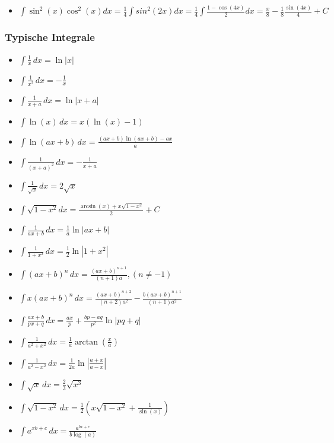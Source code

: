 \documentclass[25pt]{sciposter}
\begin{document}
\begin{multicols}{3}
\begin{itemize}
	\item $\int \sin^2(x) \cos^2(x) dx = \frac{1}{4}\int sin^2(2x) dx = \frac{1}{4} \int \frac{1-\cos(4x)}{2}dx = \frac{x}{8} - \frac{1}{8} \frac{\sin(4x)}{4} + C$  
	
\end{itemize}



\subsubsection*{Typische Integrale}

\begin{itemize}
	\item $\int \frac{1}{x} \,dx = \ln |x|$
	\item $\int \frac{1}{x^2} \,dx = -\frac{1}{x}$
	\item $\int \frac{1}{x+a} \,dx = \ln |x+a|$
	\item $\int \ln(x) \,dx = x(\ln(x) - 1)$
	\item $\int \ln(ax + b) \,dx = \frac{(a x+b) \ln (a x+b)-a x}{a}$
	\item $\int \frac{1}{(x+a)^2} \,dx = - \frac{1}{x+a}$
	\item $\int \frac{1}{\sqrt{x}} \,dx = 2 \sqrt{x}$
	\item $\int \sqrt{1-x^2} dx = \frac{\arcsin(x) + x \sqrt{1-x^2}}{2} + C$
	\item $\int \frac{1}{ax+b} \,dx = \frac{1}{a} \ln |ax+b|$
	\item $\int \frac{1}{1 + x^2} \,dx = \frac{1}{2} \ln |1 + x^2|$
	\item $\int(ax + b)^n \,dx = \frac{(ax + b)^{n+1}}{(n + 1)a}, (n \neq -1)$
	\item $\int x(ax+b)^n \,dx = \frac{(ax + b)^{n+2}}{(n+2)a^2} -
	\frac{b(ax+b)^{n+1}}{(n+1)a^2}$
	\item $\int \frac{ax + b}{px + q} \,dx = \frac{ax}{p} + \frac{bp - aq}{p^2} \ln
	|pq+q|$
	\item $\int \frac{1}{a^2 + x^2} \,dx = \frac{1}{a} \arctan(\frac{x}{a})$
	\item $\int \frac{1}{a^2 - x^2} \,dx = \frac{1}{2a} \ln \left | \frac{a+x}{a-x}
	\right |$
	\item $\int \sqrt{x} \,dx = \frac{2}{3}\sqrt{x^3}$
	\item $\int \sqrt{1-x^2} \,dx = \frac{1}{2}\left( x\sqrt{1-x^2}+\frac{1}{\sin(x)} \right)$
	\item $\int a^{xb + c} \,dx = \frac{a^{bx + c}}{b \log(a)}$
\end{itemize}


\end{multicols}
\end{document}
